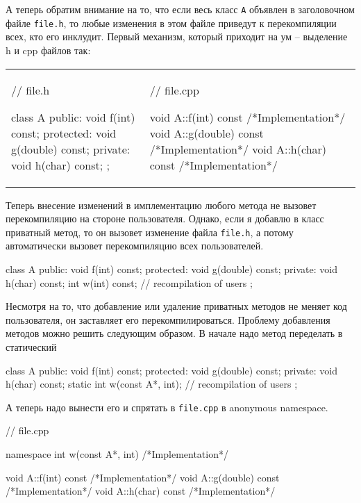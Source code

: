 А теперь обратим внимание на то, что если весь класс \verb"A" объявлен в заголовочном файле \verb"file.h", то любые изменения в этом файле приведут к перекомпиляции всех, кто его инклудит.
Первый механизм, который приходит на ум -- выделение h и cpp файлов так:
\begin{center}
\begin{tabular}{ll}
{
\begin{minipage}[\baselineskip]{8cm}
\begin{cppcode}[numbers = none]
// file.h

class A {
public:
  void f(int) const;
protected:
  void g(double) const;
private:
  void h(char) const;
};

\end{cppcode}
\end{minipage}
}&{
\begin{minipage}[\baselineskip]{8cm}
\begin{cppcode}[numbers = none]
// file.cpp

void A::f(int) const {
  /*Implementation*/
}
void A::g(double) const {
  /*Implementation*/
}
void A::h(char) const {
  /*Implementation*/
}
\end{cppcode}
\end{minipage}
}\\
\end{tabular}
\end{center}
Теперь внесение изменений в имплементацию любого метода не вызовет перекомпиляцию на стороне пользователя.
Однако, если я добавлю в класс приватный метод, то он вызовет изменение файла \texttt{file.h}, а потому автоматически вызовет перекомпиляцию всех пользователей.
\begin{cppcode}
class A {
public:
  void f(int) const;
protected:
  void g(double) const;
private:
  void h(char) const;
  int w(int) const; // recompilation of users
};
\end{cppcode}
Несмотря на то, что добавление или удаление приватных методов не меняет код пользователя, он заставляет его перекомпилироваться.
Проблему добавления методов можно решить следующим образом.
В начале надо метод переделать в статический
\begin{cppcode}
class A {
public:
  void f(int) const;
protected:
  void g(double) const;
private:
  void h(char) const;
  static int w(const A*, int); // recompilation of users
};
\end{cppcode}
А теперь надо вынести его и спрятать в \texttt{file.cpp} в anonymous namespace.
\begin{cppcode}
// file.cpp

namespace {
int w(const A*, int) {
  /*Implementation*/
}
}

void A::f(int) const {
  /*Implementation*/
}
void A::g(double) const {
  /*Implementation*/
}
void A::h(char) const {
  /*Implementation*/
}
\end{cppcode}
